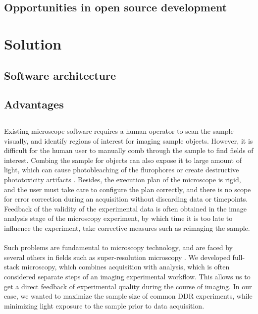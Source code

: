 \subsection{Opportunities in open source development}
\section{Solution}
\subsection{Software architecture}
\subsection{Advantages}
\subsection{}

\paragraph*{} Existing microscope software requires a human operator to scan the sample visually, and identify regions of interest for imaging sample objects. However, it is difficult for the human user to manually comb through the sample to find fields of interest. Combing the sample for objects can also expose it to large amount of light, which can cause photobleaching of the flurophores or create destructive phototoxicity artifacts \cite{scherf2015smart}. Besides, the execution plan of the microscope is rigid, and the user must take care to configure the plan correctly, and there is no scope for error correction during an acquisition without discarding data or timepoints. Feedback of the validity of the experimental data is often obtained in the image analysis stage of the microscopy experiment, by which time it is too late to influence the experiment, take corrective measures such as reimaging the sample.

\paragraph*{} Such problems are fundamental to microscopy technology, and are faced by several others in fields such as super-resolution microscopy \cite{D1SC05506B}. We developed full-stack microscopy, which combines acquisition with analysis, which is often considered separate steps of an imaging experimental workflow. This allows us to get a direct feedback of experimental quality during the course of imaging. In our case, we wanted to maximize the sample size of common DDR experiments, while minimizing light exposure to the sample prior to data acquisition.


